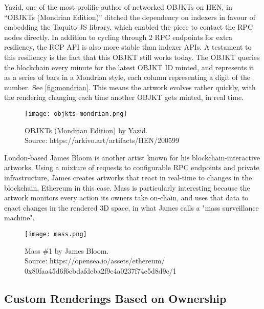 Yazid, one of the most prolific author of networked OBJKTs on HEN, in ``OBJKTs (Mondrian Edition)'' ditched the dependency on indexers in favour of embedding the Taquito JS library, which enabled the piece to contact the RPC nodes directly. In addition to cycling through 2 RPC endpoints for extra resiliency, the RCP API is also more stable than indexer APIs. A testament to this resiliency is the fact that this OBJKT still works today. The OBJKT queries the blockchain every minute for the latest OBJKT ID minted, and represents it as a series of bars in a Mondrian style, each column representing a digit of the number. See \autoref{fig:mondrian}. This means the artwork evolves rather quickly, with the rendering changing each time another OBJKT gets minted, in real time.

\begin{figure}[h]
    \centering
    \captionsetup{justification=centering}
    \texttt{[image: objkts-mondrian.png]}
    \captionsetup{justification=centering}
    \caption[OBJKTs (Mondrian Edition) by Yazid]{OBJKTs (Mondrian Edition) by Yazid. \\ Source: https://arkivo.art/artifacts/HEN/200599}
    \label{fig:mondrian}
\end{figure}

London-based James Bloom is another artist known for his blockchain-interactive artworks. Using a mixture of requests to configurable RPC endpoints and private infrastructure, James creates artworks that react in real-time to changes in the blockchain, Ethereum in this case. Mass is particularly interesting because the artwork monitors every action its owners take on-chain, and uses that data to enact changes in the rendered 3D space, in what James calls a "mass surveillance machine".

\begin{figure}[h]
    \centering
    \captionsetup{justification=centering}
    \texttt{[image: mass.png]}
    \captionsetup{justification=centering}
    \caption[Mass \#1 by James Bloom]{Mass \#1 by James Bloom. \\ Source: https://opensea.io/assets/ethereum/ \\
    0x80faa45d6f6cbdafdeba2f9c4a0237f74e5d8d9c/1}
    \label{fig:mass}
\end{figure}


\subsection{Custom Renderings Based on Ownership}

